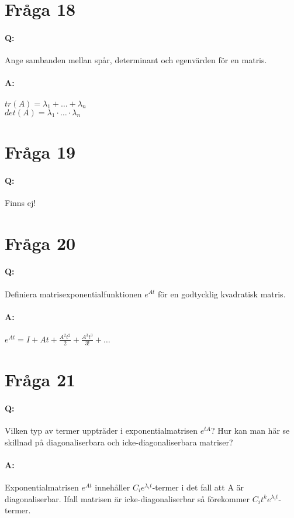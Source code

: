 \documentclass[a4paper]{article}
\begin{document}
\section{Fråga 18}
\paragraph{Q:} Ange sambanden mellan spår, determinant och egenvärden för en matris.
\paragraph{A:} $tr(A)=\lambda_1 + \ldots + \lambda_n$ \\ $det(A)=\lambda_1 \cdot \ldots \cdot \lambda_n$

\section{Fråga 19}
\paragraph{Q:} Finns ej!

\section{Fråga 20}
\paragraph{Q:} Definiera matrisexponentialfunktionen $e^{At}$ för en godtycklig kvadratisk matris. 
\paragraph{A:} $e^{At} = I + At + \frac{A^2t^2}{2} +  \frac{A^3t^3}{3!} + \ldots$

\section{Fråga 21}
\paragraph{Q:} Vilken typ av termer uppträder i exponentialmatrisen $e^{tA}$? Hur kan man här se skillnad på diagonaliserbara och icke-diagonaliserbara matriser?
\paragraph{A:} Exponentialmatrisen $e^{At}$ innehåller $C_ie^{\lambda_it}$-termer i det fall att A är diagonaliserbar. Ifall matrisen är icke-diagonaliserbar så förekommer $C_it^ke^{\lambda_it}$-termer.
\end{document}
